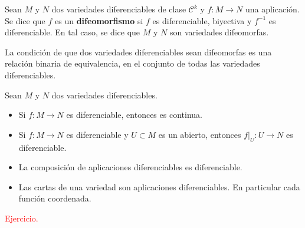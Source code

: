 \begin{defi}
Sean $M$ y $N$ dos variedades diferenciables de clase $\mathcal{C}^k$ y $f:M\longrightarrow N$ una aplicación. Se dice que $f$ es un \textbf{difeomorfismo} si $f$ es diferenciable, biyectiva y $f^{-1}$ es diferenciable. En tal caso, se dice que $M$ y $N$ son variedades difeomorfas.
\end{defi}  
\begin{obs}
    La condici\'on de que dos variedades diferenciables sean difeomorfas es una relaci\'on binaria de equivalencia, en el conjunto de todas las variedades diferenciables.
\end{obs}
\begin{prop}
Sean $M$ y $N$ dos variedades diferenciables.
\begin{itemize}
    \item Si $f:M\to N$ es diferenciable, entonces es continua.
    \item Si $f:M \to N$ es diferenciable y $U \subset M$ es un abierto, entonces $f|_U :U \to N$ es diferenciable.
     \item La composición de aplicaciones diferenciables es diferenciable.
    \item Las cartas de una variedad son aplicaciones diferenciables. En particular cada funci\'on coordenada.
\end{itemize}
\end{prop}
\begin{demx}
\textcolor{red}{Ejercicio.}
\end{demx}


